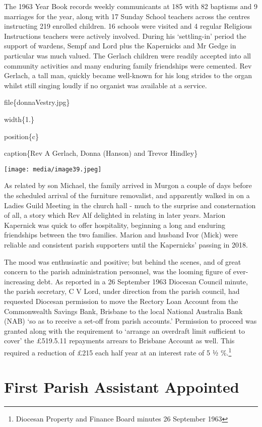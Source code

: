 The 1963 Year Book records weekly communicants at 185 with 82 baptisms and 9 marriages for the year, along with 17 Sunday School teachers across the centres instructing 219 enrolled children. 16 schools were visited and 4 regular Religious Instructions teachers were actively involved. During his `settling-in' period the support of wardens, Sempf and Lord plus the Kapernicks and Mr Gedge in particular was much valued. The Gerlach children were readily accepted into all community activities and many enduring family friendships were cemented. Rev Gerlach, a tall man, quickly became well-known for his long strides to the organ whilst still singing loudly if no organist was available at a service.

file\{donnaVestry.jpg\}

width\{1.\}

position\{c\}

caption\{Rev A Gerlach, Donna (Hanson) and Trevor Hindley\}

\texttt{[image: media/image39.jpeg]}

As related by son Michael, the family arrived in Murgon a couple of days before the scheduled arrival of the furniture removalist, and apparently walked in on a Ladies Guild Meeting in the church hall - much to the surprise and consternation of all, a story which Rev Alf delighted in relating in later years. Marion Kapernick was quick to offer hospitality, beginning a long and enduring friendships between the two families. Marion and husband Ivor (Mick) were reliable and consistent parish supporters until the Kapernicks' passing in 2018.

The mood was enthusiastic and positive; but behind the scenes, and of great concern to the parish administration personnel, was the looming figure of ever-increasing debt. As reported in a 26 September 1963 Diocesan Council minute, the parish secretary, C V Lord, under direction from the parish council, had requested Diocesan permission to move the Rectory Loan Account from the Commonwealth Savings Bank, Brisbane to the local National Australia Bank (NAB) `so as to receive a set-off from parish accounts.' Permission to proceed was granted along with the requirement to `arrange an overdraft limit sufficient to cover' the £519.5.11 repayments arrears to Brisbane Account as well. This required a reduction of £215 each half year at an interest rate of 5 ½ \%.\footnote{Diocesan Property and Finance Board minutes 26 September 1963}

\hypertarget{first-parish-assistant-appointed}{%
\section{First Parish Assistant Appointed}\label{first-parish-assistant-appointed}}

